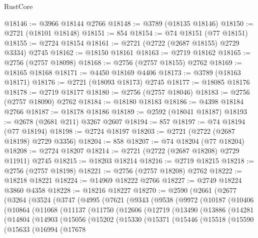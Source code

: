 \begin{lexlean}{RustCore}
\begin{coremodule}
@18146 := @3966 @18144 @2766
@18148 := @3789 (@18135 @18146)
@18150 := @2721 (@18101 @18148)
@18151 := 854
@18154 := @74 @18151 (@77 @18151)
@18155 := @2724 @18154
@18161 := @2721 (@2722 (@2687 @18155) @2729 @3334) @2745
@18162 := @18150 @18161
@18163 := @2719 @18162
@18165 := @2756 (@2757 @18098)
@18168 := @2756 (@2757 @18155) @2762
@18169 := @18165 @18168
@18171 := @4450 @18169 @4406
@18173 := @3789 (@18163 @18171)
@18176 := @2721 (@18093 @18173) @2745
@18177 := @18085 @18176
@18178 := @2719 @18177
@18180 := @2756 (@2757 @18046)
@18183 := @2756 (@2757 @18090) @2762
@18184 := @18180 @18183
@18186 := @4398 @18184 @2766
@18187 := @18178 @18186
@18189 := @2592 (@18041 @18187)
@18193 := @2678 (@2681 @211) @3267 @2607
@18194 := 857
@18197 := @74 @18194 (@77 @18194)
@18198 := @2724 @18197
@18203 := @2721 (@2722 (@2687 @18198) @2729 @3356)
@18204 := 858
@18207 := @74 @18204 (@77 @18204)
@18208 := @2724 @18207
@18214 := @2721 (@2722 (@2687 @18208) @2729 @11911) @2745
@18215 := @18203 @18214
@18216 := @2719 @18215
@18218 := @2756 (@2757 @18198)
@18221 := @2756 (@2757 @18208) @2762
@18222 := @18218 @18221
@18224 := @14969 @18222 @2766
@18227 := @2749 @18224 @3860 @4358
@18228 := @18216 @18227
@18270 := @2590
    (@2661
      (@2677
        (@3264
          (@3524
            (@3747
              (@4995
                (@7621
                  (@9343
                    (@9538
                      (@9972
                        (@10187
                          (@10406
                            (@10864
                              (@11068
                                (@11137
                                  (@11750
                                    (@12606
                                      (@12719
                                        (@13490
                                          (@13886
                                            (@14281
                                              (@14804
                                                (@14903
                                                  (@15056
                                                    (@15202
                                                      (@15330
                                                        (@15371
                                                          (@15446
                                                            (@15518
                                                              (@15590
                                                                (@15633
                                                                  (@16994
                                                                    (@17678

\end{coremodule}
\end{lexlean}
